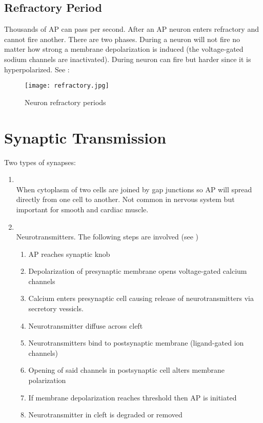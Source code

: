 \documentclass[../Psych_Soci_review.tex]{subfiles}
\begin{document}
\subsection{Refractory Period}

Thousands of AP can pass per second. After an AP neuron enters refractory and
cannot fire another. There are two phases. During  a neuron will not fire no matter how strong a membrane depolarization is
induced (the voltage-gated sodium channels are inactivated). During
 neuron can fire but harder since it is
hyperpolarized. See :

\begin{figure}[H]
  \centering
  \texttt{[image: refractory.jpg]}
  \caption{Neuron refractory periods}
  \label{refractory}
\end{figure}

\section{Synaptic Transmission}

Two types of synapses:
\begin{enumerate}
  \item {}\\
    When cytoplasm of two cells are joined by gap junctions so AP will spread
    directly from one cell to another. Not common in nervous system but
    important for smooth and cardiac muscle.
  \item {}\\
    Neurotransmitters. The following steps are involved (see  )

    \begin{enumerate}
      \item AP reaches synaptic knob
      \item Depolarization of presynaptic membrane opens voltage-gated calcium
        channels
      \item Calcium enters presynaptic cell causing release of neurotransmitters
        via secretory vessicls.
      \item Neurotransmitter diffuse across cleft
      \item Neurotransmitters bind to postsynaptic membrane (ligand-gated ion
        channels)
      \item Opening of said channels in postsynaptic cell alters membrane
        polarization
      \item If membrane depolarization reaches threshold then AP is initiated
      \item Neurotransmitter in cleft is degraded or removed
    \end{enumerate}
\end{enumerate}
\end{document}
